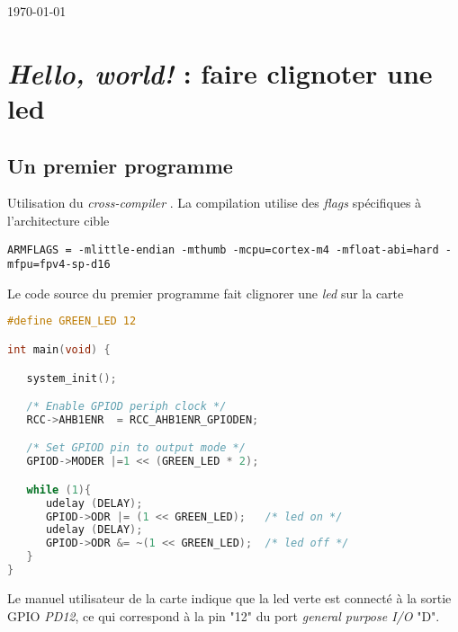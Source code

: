 \documentclass{FicheLecture}
\begin{document}
{\raggedright\sffamily\bfseries\LARGE\textcolor{RoyalBlue}{\GetTitre}\par}
{\raggedright\sffamily\bfseries\large {\GetSousTitre} \par}
\vskip 20pt
{\raggedright\sffamily\large{\GetAuteur}\par}
{\raggedright\sffamily\large{\today}}
\vskip 40pt

\tableofcontents

\AddEntetesPiedsDePage


\section{\emph{Hello, world!} : faire clignoter une led}

\subsection{Un premier programme}
Utilisation du \emph{cross-compiler} .
La compilation utilise des \emph{flags} spécifiques à l'architecture cible 

\begin{lstlisting} 
ARMFLAGS = -mlittle-endian -mthumb -mcpu=cortex-m4 -mfloat-abi=hard -mfpu=fpv4-sp-d16 
\end{lstlisting}

Le code source du premier programme fait clignorer une \emph{led} sur la carte

\begin{lstlisting}[language=C]
#define GREEN_LED 12

int main(void) {

   system_init();

   /* Enable GPIOD periph clock */
   RCC->AHB1ENR  = RCC_AHB1ENR_GPIODEN;

   /* Set GPIOD pin to output mode */
   GPIOD->MODER |=1 << (GREEN_LED * 2);

   while (1){
      udelay (DELAY);
      GPIOD->ODR |= (1 << GREEN_LED);   /* led on */
      udelay (DELAY);
      GPIOD->ODR &= ~(1 << GREEN_LED);  /* led off */
   }
}

\end{lstlisting}

Le manuel utilisateur \cite{user:manual} de la carte indique que la led verte est connecté à la sortie GPIO \emph{PD12}, ce qui correspond à la pin "12" du port \emph{general purpose I/O} "D".
\end{document}
